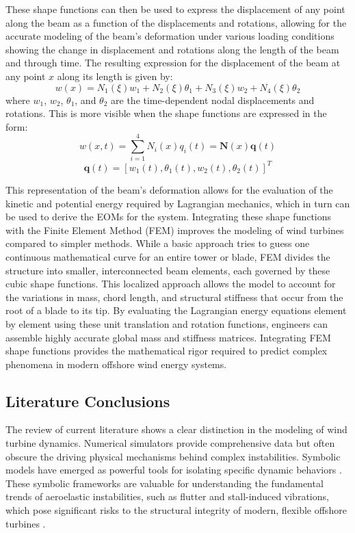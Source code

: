 \documentclass[final,onecolumn]{IEEEtran}
\begin{document}
These shape functions can then be used to express the displacement of any point along the beam as a function of the displacements and rotations, allowing for the accurate modeling of the beam's deformation under various loading conditions showing the change in displacement and rotations along the length of the beam and through time. The resulting expression for the displacement of the beam at any point $x$ along its length is given by:
$$w(x) = N_1(\xi) w_1 + N_2(\xi) \theta_1 + N_3(\xi) w_2 + N_4(\xi) \theta_2$$
where $w_1$, $w_2$, $\theta_1$, and $\theta_2$ are the time-dependent nodal displacements and rotations. This is more visible when the shape functions are expressed in the form:
$$w(x, t) = \sum_{i=1}^{4} N_i(x) q_i(t) = \mathbf{N}(x)\mathbf{q}(t)$$
$$\mathbf{q}(t) = [w_1(t), \theta_1(t), w_2(t), \theta_2(t)]^T$$

This representation of the beam's deformation allows for the evaluation of the kinetic and potential energy required by Lagrangian mechanics, which in turn can be used to derive the EOMs for the system. Integrating these shape functions with the Finite Element Method (FEM)  improves the modeling of wind turbines compared to simpler methods. While a basic approach tries to guess one continuous mathematical curve for an entire tower or blade, FEM divides the structure into smaller, interconnected beam elements, each governed by these cubic shape functions. This localized approach allows the model to account for the variations in mass, chord length, and structural stiffness that occur from the root of a blade to its tip. By evaluating the Lagrangian energy equations element by element using these unit translation and rotation functions, engineers can assemble highly accurate global mass and stiffness matrices. Integrating FEM shape functions provides the mathematical rigor required to predict complex phenomena in modern offshore wind energy systems.

\subsection{Literature Conclusions}
The review of current literature shows a clear distinction in the modeling of wind turbine dynamics. Numerical simulators provide comprehensive data but often obscure the driving physical mechanisms behind complex instabilities. Symbolic models have emerged as powerful tools for isolating specific dynamic behaviors \cite{branlard2022symbolic}. These symbolic frameworks are valuable for understanding the fundamental trends of aeroelastic instabilities, such as flutter and stall-induced vibrations, which pose significant risks to the structural integrity of modern, flexible offshore turbines \cite{hansen2007aeroelastic}.
\end{document}
